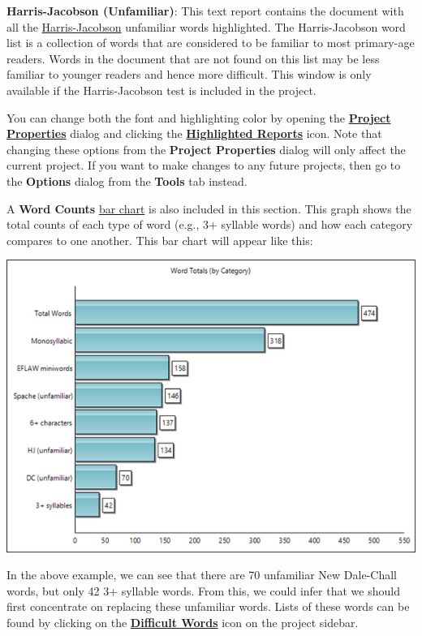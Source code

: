 \documentclass[
]{book}
\theoremstyle{definition}
\theoremstyle{definition}
\theoremstyle{definition}
\theoremstyle{definition}
\theoremstyle{remark}
\begin{document}
\textbf{Harris-Jacobson (Unfamiliar)}: This text report contains the document with all the \protect\hyperlink{harris-jacobson}{Harris-Jacobson} unfamiliar words highlighted. The Harris-Jacobson word list is a collection of words that are considered to be familiar to most primary-age readers. Words in the document that are not found on this list may be less familiar to younger readers and hence more difficult. This window is only available if the Harris-Jacobson test is included in the project.

You can change both the font and highlighting color by opening the \protect\hyperlink{options-overview}{\textbf{Project Properties}} dialog and clicking the \protect\hyperlink{options-highlighted-reports}{\textbf{Highlighted Reports}} icon. Note that changing these options from the \textbf{Project Properties} dialog will only affect the current project. If you want to make changes to any future projects, then go to the \textbf{Options} dialog from the \textbf{Tools} tab instead.

A \textbf{Word Counts} \protect\hyperlink{options-bar-charts}{bar chart} is also included in this section. This graph shows the total counts of each type of word (e.g., 3+ syllable words) and how each category compares to one another. This bar chart will appear like this:

\includegraphics{Images/barchart.png}

In the above example, we can see that there are 70 unfamiliar New Dale-Chall words, but only 42 3+ syllable words. From this, we could infer that we should first concentrate on replacing these unfamiliar words. Lists of these words can be found by clicking on the \protect\hyperlink{reviewing-word-breakdowns}{\textbf{Difficult Words}} icon on the project sidebar.
\end{document}
